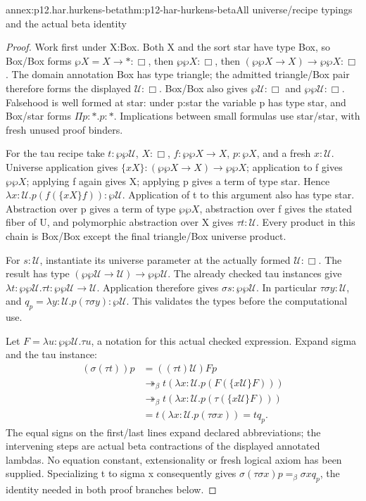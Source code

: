 \begin{annexitem}{annex:p12.har.hurkens-beta}{thm:p12-har-hurkens-beta}{All universe/recipe typings and the actual beta identity}
\begin{proof}
Work first under X:Box. Both X and the sort star have type Box,
so Box/Box forms \(\wp X=X\to\ast:\Box\), then
\(\wp\wp X:\Box\), then
\((\wp\wp X\to X)\to\wp\wp X:\Box\).
The domain annotation Box has type triangle; the admitted triangle/Box
pair therefore forms the displayed \(\mathcal U:\Box\).
Box/Box also gives \(\wp\mathcal U:\Box\) and
\(\wp\wp\mathcal U:\Box\). Falsehood is well formed at star:
under p:star the variable p has type star, and Box/star forms
\(\Pi p:\ast.p:\ast\). Implications between small formulas
use star/star, with fresh unused proof binders.

For the tau recipe take \(t:\wp\wp\mathcal U\),
\(X:\Box\), \(f:\wp\wp X\to X\), \(p:\wp X\),
and a fresh \(x:\mathcal U\). Universe application gives
\(\{xX\}:(\wp\wp X\to X)\to\wp\wp X\);
application to f gives \(\wp\wp X\); applying f again gives
X; applying p gives a term of type star. Hence
\(\lambda x:\mathcal U.p(f(\{xX\}f)):\wp\mathcal U\).
Application of t to this argument also has type star. Abstraction over
p gives a term of type \(\wp\wp X\), abstraction over f gives
the stated fiber of U, and polymorphic abstraction over X gives
\(\tau t:\mathcal U\). Every product in this chain is
Box/Box except the final triangle/Box universe product.

For \(s:\mathcal U\), instantiate its universe parameter at
the actually formed \(\mathcal U:\Box\). The result has type
\((\wp\wp\mathcal U\to\mathcal U)\to\wp\wp\mathcal U\).
The already checked tau instances give
\(\lambda t:\wp\wp\mathcal U.\tau t:
\wp\wp\mathcal U\to\mathcal U\). Application therefore
gives \(\sigma s:\wp\wp\mathcal U\). In particular
\(\tau\sigma y:\mathcal U\), and
\(q_p=\lambda y:\mathcal U.p(\tau\sigma y):\wp\mathcal U\).
This validates the types before the computational use.

Let \(F=\lambda u:\wp\wp\mathcal U.\tau u\), a notation
for this actual checked expression. Expand sigma and the tau instance:
\[
\begin{aligned}
 (\sigma(\tau t))p
 &=((\tau t)\mathcal U)F p\\
 &\twoheadrightarrow_\beta
 t(\lambda x:\mathcal U.p(F(\{x\mathcal U\}F)))\\
 &\twoheadrightarrow_\beta
 t(\lambda x:\mathcal U.p(\tau(\{x\mathcal U\}F)))\\
 &=t(\lambda x:\mathcal U.p(\tau\sigma x))=tq_p.
\end{aligned}
\]
The equal signs on the first/last lines expand declared abbreviations;
the intervening steps are actual beta contractions of the displayed
annotated lambdas. No equation constant, extensionality or fresh logical
axiom has been supplied. Specializing t to sigma x consequently gives
\(\sigma(\tau\sigma x)p=_\beta\sigma x q_p\), the identity
needed in both proof branches below.
\end{proof}
\end{annexitem}

